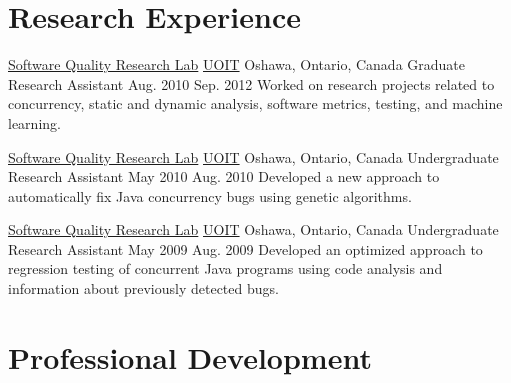   \section{Research Experience}

  \researchEntry
    {\href{http://sqrlab.ca/}{Software Quality Research Lab}}
    {\href{http://www.uoit.ca/}{UOIT}}
    {Oshawa, Ontario, Canada}
    {Graduate Research Assistant}
    {Aug. 2010}
    {Sep. 2012}
    {Worked on research projects related to concurrency, static and dynamic analysis, software metrics, testing, and machine learning.}

  \researchEntry
    {\href{http://sqrlab.ca/}{Software Quality Research Lab}}
    {\href{http://www.uoit.ca/}{UOIT}}
    {Oshawa, Ontario, Canada}
    {Undergraduate Research Assistant}
    {May 2010}
    {Aug. 2010}
    {Developed a new approach to automatically fix Java concurrency bugs using genetic algorithms.}

  \researchEntry
    {\href{http://sqrlab.ca/}{Software Quality Research Lab}}
    {\href{http://www.uoit.ca/}{UOIT}}
    {Oshawa, Ontario, Canada}
    {Undergraduate Research Assistant}
    {May 2009}
    {Aug. 2009}
    {Developed an optimized approach to regression testing of concurrent Java programs using code analysis and information about previously detected bugs.}

  \newpage
  \section{Professional Development}


